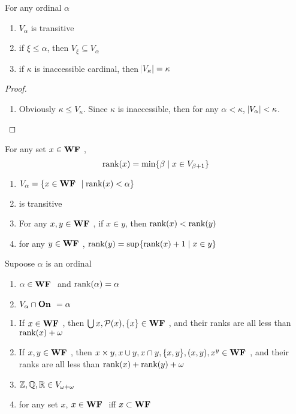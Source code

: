 \documentclass[11pt]{article}
\begin{document}
\begin{lemma}[]
For any ordinal \(\alpha\)
\begin{enumerate}
\item \(V_\alpha\) is transitive
\item if \(\xi\le\alpha\), then \(V_\xi\subseteq V_\alpha\)
\item if \(\kappa\) is inaccessible cardinal, then \(\abs{V_\kappa}=\kappa\)
\end{enumerate}
\end{lemma}

\begin{proof}
\begin{enumerate}
\item Obviously \(\kappa\le V_\kappa\). Since \(\kappa\) is inaccessible, then for any
\(\alpha<\kappa\), \(\abs{V_\alpha}<\kappa\).
\end{enumerate}
\end{proof}

\begin{definition}[]
For any set \(x\in\textbf{WF }\), 
\begin{equation*}
\text{rank}(x)=\min\{\beta\mid x\in V_{\beta+1}\}
\end{equation*}
\end{definition}

\begin{lemma}[]
\begin{enumerate}
\item \(V_\alpha=\{x\in\textbf{WF }\mid\text{rank}(x)<\alpha\}\)
\item \wf is transitive
\item For any \(x,y\in\textbf{WF }\), if \(x\in y\), then \(\text{rank}(x)<\text{rank}(y)\)
\item for any \(y\in\textbf{WF }\), \(\text{rank}(y)=\sup\{\text{rank}(x)+1\mid x\in y\}\)
\end{enumerate}
\end{lemma}

\begin{lemma}[]
Supoose \(\alpha\) is an ordinal
\begin{enumerate}
\item \(\alpha\in\textbf{WF }\) and \(\text{rank}(\alpha)=\alpha\)
\item \(V_\alpha\cap\textbf{On }=\alpha\)
\end{enumerate}
\end{lemma}

\begin{lemma}[]
\begin{enumerate}
\item If \(x\in\textbf{WF }\), then \(\bigcup x,\mathcal{P}(x),\{x\}\in\textbf{WF }\), and their ranks are
all less than \(\text{rank}(x)+\omega\)
\item If \(x,y\in\textbf{WF }\), then \(x\times y,x\cup y,x\cap y,\{x,y\},(x,y),x^y\in\textbf{WF }\),
and their ranks are all less than \(\text{rank}(x)+\text{rank}(y)+\omega\)
\item \(\mathbb{Z},\mathbb{Q},\mathbb{R}\in V_{\omega+\omega}\)
\item for any set \(x\), \(x\in\textbf{WF }\) iff \(x\subset\textbf{WF }\)
\end{enumerate}
\end{lemma}
\end{document}
